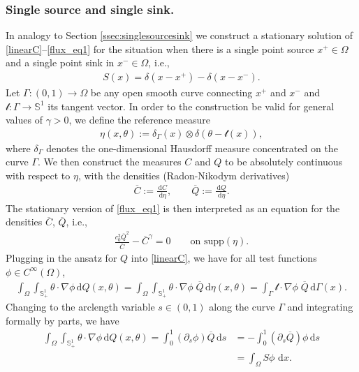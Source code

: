 \documentclass{article}
\numberwithin{equation}{section}
\def\[{\begin{eqnarray*}}
\def\]{\end{eqnarray*}}
\def\d{\,\mathrm{d}}
\begin{document}
\subsubsection{Single source and single sink.}\label{ssec:singlesourcesink2}
In analogy to Section \ref{ssec:singlesourcesink} we construct a stationary solution of \eqref{linearC}--\eqref{flux_eq1}
for the situation when there is a single point source $x^+\in\Omega$ and a single point sink in $x^-\in\Omega$, i.e.,
\[
   S(x) =\delta(x-{x^+}) - \delta(x-{x^-}).
\]
Let $\Gamma: (0,1) \to \Omega$ be any open smooth curve connecting $x^+$ and $x^-$
and $\mathcal{t}: \Gamma \to \mathbb{S}^1$ its tangent vector.
In order to the construction be valid for general values of $\gamma>0$, we define the reference measure
\[
   \eta(x,\theta) := \delta_\Gamma(x) \otimes \delta(\theta-\mathcal{t}(x)),
\]
where $\delta_\Gamma$ denotes the one-dimensional Hausdorff measure concentrated on the curve $\Gamma$.
We then construct the measures $C$ and $Q$ to be absolutely continuous with respect to $\eta$,
with the densities (Radon-Nikodym derivatives)
\[
   \overline{C} := \frac{\d C}{\d\eta},\qquad \overline{Q} := \frac{\d Q}{\d\eta}.
\]
The stationary version of \eqref{flux_eq1} is then interpreted as an equation for the densities $\overline{C}$, $\overline{Q}$, i.e.,
\begin{align}\label{flux_eq1_bar}
   \frac{c_0^2 \overline{Q}^2}{\overline{C}}-\overline{C}^\gamma = 0\qquad\mbox{on supp}(\eta).
\end{align}
Plugging in the ansatz for $Q$ into \eqref{linearC}, we have for all test functions $\phi\in C^\infty(\Omega)$,
\begin{align*}
   \int_\Omega \int_{\mathbb{S}_+^1} \theta\cdot\nabla\phi \d Q(x,\theta) = \int_\Omega \int_{\mathbb{S}_+^1} \theta\cdot\nabla\phi\; \overline{Q} \d \eta(x,\theta)
    = \int_\Gamma \mathcal{t}\cdot\nabla\phi\; \overline{Q} \d\Gamma(x).
\end{align*}
Changing to the arclength variable $s\in(0,1)$ along the curve $\Gamma$ and integrating formally by parts, we have
\begin{align*}
   \int_\Omega \int_{\mathbb{S}_+^1} \theta\cdot\nabla\phi \d Q(x,\theta) =
      \int_0^1 (\partial_s\phi) \overline{Q} \d s 
   & =- \int_0^1 (\partial_s\overline{Q}) \phi \d s \\
    & = \int_\Omega S \phi\, \d x.
\end{align*}
\end{document}
